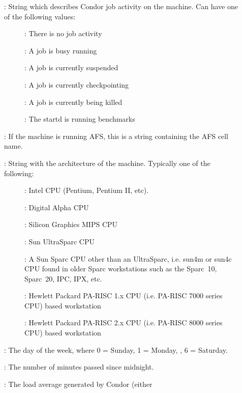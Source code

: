 \begin{description}
%
\item[] : String which describes Condor job activity on the machine.
Can have one of the following values:
	\begin{description}
	\item[] : There is no job activity
	\item[] : A job is busy running
	\item[] : A job is currently suspended
	\item[] : A job is currently checkpointing
	\item[] : A job is currently being killed
	\item[] : The startd is running benchmarks
	\end{description}
%
\item[] : If the machine is running AFS, this is a string
containing the AFS cell name.
%
\item[] : String with the architecture of the machine.  Typically
one of the following: 
	\begin{description}
	\item[] : Intel CPU (Pentium, Pentium II, etc).
	\item[] : Digital Alpha CPU
	\item[] : Silicon Graphics MIPS CPU
	\item[] : Sun UltraSparc CPU
	\item[] : A Sun Sparc CPU other than an UltraSparc, i.e.
sun4m or sun4c CPU found in older Sparc workstations such as the Sparc~10, 
Sparc~20, IPC, IPX, etc.
	\item[] :  Hewlett Packard PA-RISC 1.x CPU (i.e. PA-RISC    
                      7000 series CPU) based workstation
	\item[] :  Hewlett Packard PA-RISC 2.x CPU (i.e. PA-RISC    
                      8000 series CPU) based workstation
	\end{description}
%
\item[] : The day of the week, where 0 = Sunday, 1 = Monday, \Dots, 6 = Saturday. 
%
\item[] : The number of minutes passed since midnight.
%
\item[] : The load average generated by Condor (either

\end{description}

